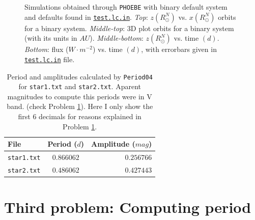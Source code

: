 \begin{figure}[tb]
\caption{Simulations obtained through \texttt{PHOEBE} with binary default system and defaults found in \href{https://raw.githubusercontent.com/phoebe-project/phoebe2-docs/master/tutorials/test.lc.in}{\texttt{test.lc.in}}. \textit{Top}: $z (R_{\odot}^N)$ vs. $x (R_{\odot}^N)$ orbits for a binary system. \textit{Middle-top}: 3D plot orbits for a binary system (with its units in $AU$). \textit{Middle-bottom}: $z(R_{\odot}^N)$ vs. time $(d)$. \textit{Bottom}: flux ($W \cdot m^{-2}$) vs. time $(d)$, with errorbars given in \href{https://raw.githubusercontent.com/phoebe-project/phoebe2-docs/master/tutorials/test.lc.in}{\texttt{test.lc.in}} file.} 
\label{fig:F1}
\end{figure}

\begin{table}[ht]
\centering
\caption{\label{table:period04calc} Period and amplitudes calculated by \texttt{Period04} for \texttt{star1.txt} and \texttt{star2.txt}. Aparent magnitudes to compute this periods were in V band. (check Problem \ref{sec:p3}). Here I only show the first 6 decimals for reasons explained in Problem \ref{sec:p3}.}
\begin{tabular}{lcr}
\hline
\hline
File                          & Period ($d$) & Amplitude ($mag$)     \\
\hline
 \texttt{\texttt{star1.txt}}       &       $0.866062$ & $0.256766$\\
 \texttt{\texttt{star2.txt}} & $0.486062$ & $0.427443$ \\
\hline
\end{tabular}
\end{table}



\section{Third problem: Computing period}
\label{sec:p3}


